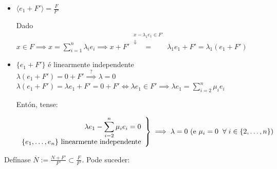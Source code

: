 \documentclass[twoside]{report}
\theoremstyle{mystyle}
\begin{document}
\begin{itemize}
    \item $\langle e_{1} + F' \rangle = \displaystyle \frac{F}{F'}$
    
    Dado $x \in F \implies x = \displaystyle \sum_{i = 1}^{n}{\lambda_{i}e_{i}} \implies x + F' \overset{\substack{x - \lambda_{1}e_{1} \in F'\\ \Downarrow}}{=} \lambda_{1}e_{1} + F' = \lambda_{1}(e_{1} + F')$\\
    
    \item $\{e_{1} + F'\}$ é linearmente independente\\
    
    $\lambda(e_{1} + F') = 0 + F' \overset{?}{\implies} \lambda = 0$\\
    
    $\lambda(e_{1} + F') = \lambda e_{1} + F' = 0 + F' \Leftrightarrow \lambda e_{1} \in F' \implies \lambda e_{1} = \displaystyle \sum_{i=2}^{n}{\mu_{i}e_{i}}$
    
    Entón, tense:
    
    \[ 
    \left. \begin{array}{r} 
    \lambda e_{1} -  \displaystyle \sum_{i=2}^{n}{\mu_{i}e_{i}} = 0\\[1ex]
    \{e_{1}, \dots, e_{n}\} \text{ linearmente independente}
    \end{array} \right\}
    \implies 
    \lambda = 0 \text{ (e } \mu_{i} = 0 \hspace{2mm} \forall \hspace{1mm} i \in \{2, \dots, n\})
    \]   
    
\end{itemize}

\vspace{3mm}

\noindent Defínase $\overline{N}:= \displaystyle \frac{N + F'}{F'} \subset \displaystyle \frac{F}{F'}$. Pode suceder:
\end{document}
